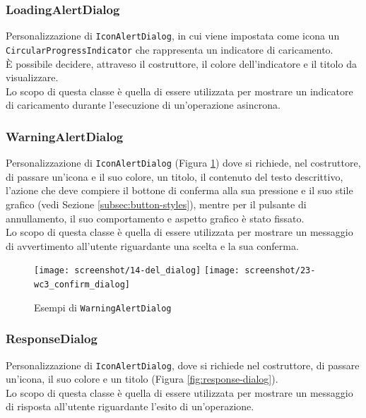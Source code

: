 \subsubsection*{LoadingAlertDialog}
\label{subsubsec:loading-alert-dialog}

Personalizzazione di \lstinline{IconAlertDialog}, in cui viene impostata come icona un \lstinline{CircularProgressIndicator}\cite{site:circular-progress-indicator} che rappresenta un indicatore di caricamento.\\
È possibile decidere, attraveso il costruttore, il colore dell'indicatore e il titolo da visualizzare.\\
Lo scopo di questa classe è quella di essere utilizzata per mostrare un indicatore di caricamento durante l'esecuzione di un'operazione asincrona.

\subsubsection*{WarningAlertDialog}
\label{subsubsec:warning-alert-dialog}

Personalizzazione di \lstinline{IconAlertDialog} (Figura \ref{fig:warning-alert-dialog}) dove si richiede, nel costruttore, di passare un'icona e il suo colore, un titolo, il contenuto del testo descrittivo, l'azione che deve compiere il bottone di conferma alla sua pressione e il suo stile grafico (vedi Sezione \ref{subsec:button-styles}), mentre per il pulsante di annullamento, il suo comportamento e aspetto grafico è stato fissato.\\
Lo scopo di questa classe è quella di essere utilizzata per mostrare un messaggio di avvertimento all'utente riguardante una scelta e la sua conferma.

\begin{figure}[!h] 
    \centering 
    \texttt{[image: screenshot/14-del\_dialog]} 
    \hfill
    \texttt{[image: screenshot/23-wc3\_confirm\_dialog]}
    \caption{Esempi di \lstinline{WarningAlertDialog}}
    \label{fig:warning-alert-dialog}
\end{figure}

\newpage

\subsubsection*{ResponseDialog}
\label{subsubsec:response-dialog}

Personalizzazione di \lstinline{IconAlertDialog}, dove si richiede nel costruttore, di passare un'icona, il suo colore e un titolo (Figura \ref{fig:response-dialog}).\\
Lo scopo di questa classe è quella di essere utilizzata per mostrare un messaggio di risposta all'utente riguardante l'esito di un'operazione.\\

